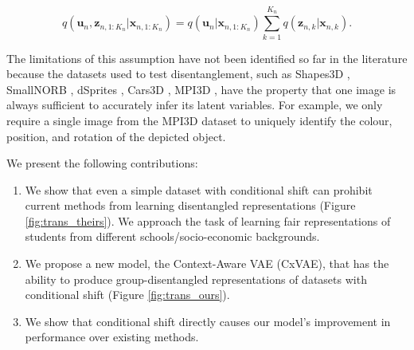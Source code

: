 \documentclass{article} %
\begin{document}
\begin{equation}
\label{eq:indep}
q(\mathbf{u}_n, \mathbf{z}_{n,1:K_n} | \mathbf{x}_{n,1:K_n}) = q(\mathbf{u}_n | \mathbf{x}_{n,1:K_n}) \sum_{k=1}^{K_n} q(\mathbf{z}_{n,k} | \mathbf{x}_{n,k}).
\end{equation}

The limitations of this assumption have not been identified so far in the literature because the datasets used to test disentanglement,  such as Shapes3D \citep{Kim2018DisentanglingBF}, SmallNORB \citep{LeCun2004LearningMF}, dSprites \citep{Higgins2017betaVAE}, Cars3D \citep{Reed2015DeepVA}, MPI3D \citep{Gondal2019OnTT}, have the property that one image is always sufficient to accurately infer its latent variables. For example, we only require a single image from the MPI3D dataset to uniquely identify the colour, position, and rotation of the depicted object.

We present the following contributions:

\begin{enumerate}
\item We show that even a simple dataset with conditional shift can prohibit current methods from learning disentangled representations (Figure \ref{fig:trans_theirs}).  We approach the task of learning fair representations of students from different schools/socio-economic backgrounds. 
\item We propose a new model, the Context-Aware VAE (CxVAE), that has the ability to produce group-disentangled representations of datasets with conditional shift (Figure \ref{fig:trans_ours}). 
\item We show that conditional shift directly causes our model's improvement in performance over existing methods.
\end{enumerate}
\end{document}

